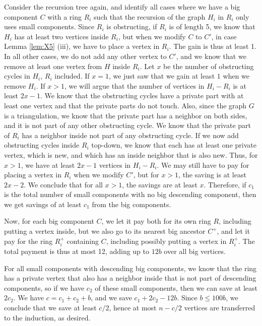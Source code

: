 \documentclass[10pt,a4paper]{article}
\begin{document}
Consider the recursion tree again, and identify all cases
where we have a big component $C$ with a ring $R_i$ such that the recursion of the graph $H_i$ in $R_i$ only uses
small components. Since $R_i$ is obstructing, if $R_i$ is of length 5, we know that $H_i$ has at least two vertices inside $R_i$, but when we modify $C$ to $C'$, in case Lemma \ref{lem:X5} (iii), we have to place a vertex in $R_i$. The gain is
thus at least 1. In all other cases, we do not add any other vertex to $C'$, and we know that we remove at least one vertex from $H$ inside $R_i$. Let
$x$ be the number of obstructing cycles in $H_i$, $R_i$ included. If $x=1$, we just saw that we gain at least $1$ when we remove $H_i$. If $x>1$, we will argue that
the number of vertices in $H_i-R_i$ is at least $2x-1$.
We know that the obstructing cycles have a private part with at least one vertex and that the private parts do not touch. Also, since the graph $G$ is a triangulation, we know that the private part has a neighbor on both sides, and it is not part of any other obstructing cycle. We know that the private part of $R_i$ has a neighbor inside not part of any obstructing cycle. If we now add obstructing cycles inside $R_i$ top-down, we know that each has at least one private vertex, which is new, and which has an inside neighbor that is also new. Thus, for $x>1$, we have at least $2x-1$ vertices in $H_i-R_i$. We may still have to pay for placing a vertex in $R_i$ when we modify $C'$, but for $x>1$, the saving is at least $2x-2$. We conclude that for all $x >1$, the savings are at least $x$. Therefore, if $c_1$ is the total number of small components with no big descending component, then we get savings of at least $c_1$ from the big components.

Now, for each big component $C$, we let it pay both for its own ring $R$, including putting a vertex inside, but we also go to its nearest big ancestor $C^+$, and let it pay for the ring $R^+_i$ containing $C$, including possibly putting a vertex in $R_i^+$. The total payment is thus at most 12, adding up to $12b$ over all big vertices.

For all small components with descending big components, we know that the ring has a private vertex that also has a neighbor inside that is not part of descending components, so if we have $c_2$ of these small components, then we can save at least $2c_2$. We have $c=c_1+c_2+b$, and we save $c_1+2c_2-12 b$. Since $b\leq 100 b$, we conclude that we save at least $c/2$, hence at most $n-c/2$ vertices are transferred to the induction, as desired.
\end{document}
